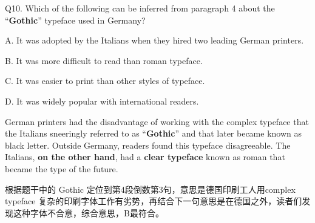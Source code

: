 \begin{blk}
    \begin{qst}
        Q10. Which of the following can be inferred from paragraph 4 about the “\textbf{Gothic}” typeface used in Germany?
    \end{qst}

    \begin{chc}
        A. It was adopted by the Italians when they hired two leading German printers.

        B. It was more difficult to read than roman typeface.

        C. It was easier to print than other styles of typeface.

        D. It was widely popular with international readers.
    \end{chc}

    \begin{psgq}
        German printers had the disadvantage of working with the complex typeface that the Italians sneeringly referred to as “\textbf{Gothic}” and that later became known as black letter. Outside Germany, readers found this typeface disagreeable. The Italians, \textbf{on the other hand}, had a \textbf{clear typeface} known as roman that became the type of the future.
    \end{psgq}

    \begin{nlz}
        根据题干中的 Gothic 定位到第4段倒数第3句，意思是德国印刷工人用complex typeface 复杂的印刷字体工作有劣势，再结合下一句意思是在德国之外，读者们发现这种字体不合意，综合意思，B最符合。
    \end{nlz}
\end{blk}

